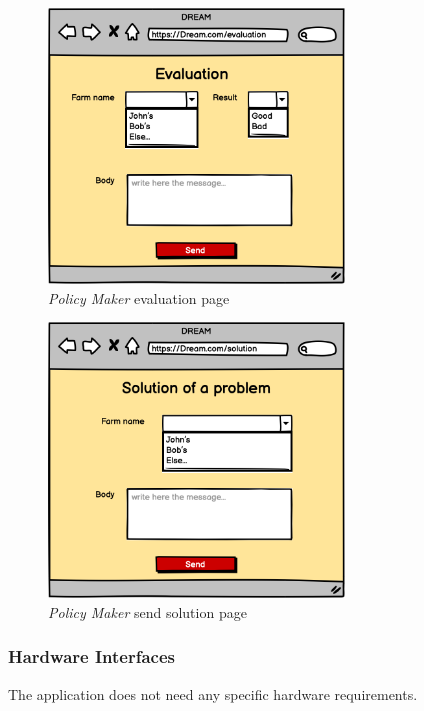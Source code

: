 \begin{figure}[H]
    \begin{center}
    \includegraphics[width=0.7\textwidth]{mocups/Evaluation.png}
    \caption{\emph{Policy Maker} evaluation page}
    \label{fig:sequence1}
    \end{center}
\end{figure}

\begin{figure}[H]
    \begin{center}
    \includegraphics[width=0.7\textwidth]{mocups/Solution.png}
    \caption{\emph{Policy Maker} send solution page}
    \label{fig:sequence1}
    \end{center}
\end{figure}

\subsubsection{Hardware Interfaces}
The application does not need any specific hardware requirements. 

